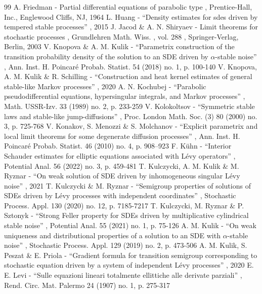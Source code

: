 \begin{thebibliography}{99}
 A. Friedman - Partial differential equations of parabolic type , Prentice-Hall, Inc., Englewood Cliffs, NJ, 1964
 L. Huang - “Density estimates for sdes driven by tempered stable processes” , 2015
 J. Jacod \& A. N. Shiryaev - Limit theorems for stochastic processes , Grundlehren Math. Wiss. , vol. 288 , Springer-Verlag, Berlin, 2003
 V. Knopova \& A. M. Kulik - “Parametrix construction of the transition probability density of the solution to an SDE driven by $\alpha $-stable noise” , Ann. Inst. H. Poincaré Probab. Statist. 54 (2018) no. 1, p. 100-140
 V. Knopova, A. M. Kulik \& R. Schilling - “Construction and heat kernel estimates of general stable-like Markov processes” , 2020
 A. N. Kochubej - “Parabolic pseudodifferential equations, hypersingular integrals, and Markov processes” , Math. USSR-Izv. 33 (1989) no. 2, p. 233-259
 V. Kolokoltsov - “Symmetric stable laws and stable-like jump-diffusions” , Proc. London Math. Soc. (3) 80 (2000) no. 3, p. 725-768
 V. Konakov, S. Menozzi \& S. Molchanov - “Explicit parametrix and local limit theorems for some degenerate diffusion processes” , Ann. Inst. H. Poincaré Probab. Statist. 46 (2010) no. 4, p. 908--923
 F. Kühn - “Interior Schauder estimates for elliptic equations associated with Lévy operators” , Potential Anal. 56 (2022) no. 3, p. 459-481
 T. Kulczycki, A. M. Kulik \& M. Ryznar - “On weak solution of SDE driven by inhomogeneous singular Lévy noise” , 2021
 T. Kulczycki \& M. Ryznar - “Semigroup properties of solutions of SDEs driven by Lévy processes with independent coordinates” , Stochastic Process. Appl. 130 (2020) no. 12, p. 7185-7217
 T. Kulczycki, M. Ryznar \& P. Sztonyk - “Strong Feller property for SDEs driven by multiplicative cylindrical stable noise” , Potential Anal. 55 (2021) no. 1, p. 75-126
 A. M. Kulik - “On weak uniqueness and distributional properties of a solution to an SDE with $\alpha $-stable noise” , Stochastic Process. Appl. 129 (2019) no. 2, p. 473-506
 A. M. Kulik, S. Peszat \& E. Priola - “Gradient formula for transition semigroup corresponding to stochastic equation driven by a system of independent Lévy processes” , 2020
 E. E. Levi - “Sulle equazioni lineari totalmente ellittiche alle derivate parziali” , Rend. Circ. Mat. Palermo 24 (1907) no. 1, p. 275-317

\end{thebibliography}
